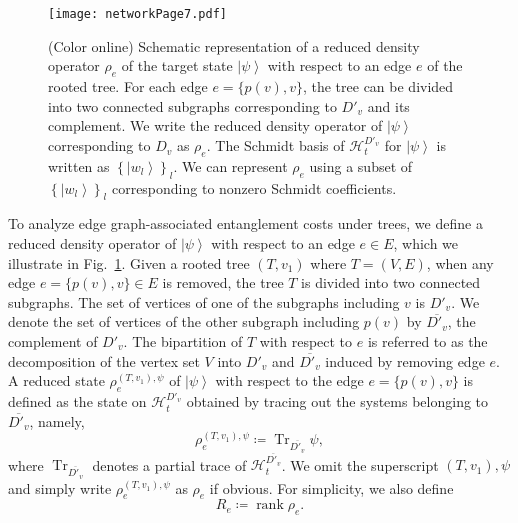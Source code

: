 \documentclass[preprintnumbers,aps,amsmath,amssymb,pra,twocolumn,showpacs,superscriptaddress,floatfix]{revtex4-1}
\def\Ket#1{\left|#1\right\rangle}
\DeclareMathOperator{\rank}{rank}
\DeclareMathOperator{\tr}{Tr}
\theoremstyle{plain}
\theoremstyle{definition}
\theoremstyle{remark}
\begin{document}
\begin{figure}
\centering
\texttt{[image: networkPage7.pdf]}
\caption{(Color online) Schematic representation of a reduced density operator $\rho_e$ of the target state $\Ket\psi$ with respect to an edge $e$ of the rooted tree.
    For each edge $e=\{p(v),v\}$, the tree can be divided into two connected subgraphs corresponding to $D'_v$ and its complement.  We write the reduced density operator of $\Ket\psi$ corresponding to $D_v$ as $\rho_e$.  The Schmidt basis of $\mathcal{H}^{D'_v}_t$ for $\Ket\psi$ is written as $\left\{\Ket{w_l}\right\} _{l}$.  We can represent $\rho_e$ using a subset of $\left\{\Ket{w_l}\right\} _{l}$ corresponding to nonzero Schmidt coefficients.
}
\label{fig:density}
\end{figure}

To analyze edge graph-associated entanglement costs under trees, we define a reduced density operator of $\Ket{\psi}$ with respect to an edge $e\in E$, which we illustrate in Fig.~\ref{fig:density}.
Given a rooted tree $(T,v_1)$ where $T=(V,E)$, when any edge $e=\{p(v),v\}\in E$ is removed, the tree $T$ is divided into two connected subgraphs.   The set of vertices of one of the subgraphs including $v$ is $D'_v$.  We denote the set of vertices of the other subgraph including $p(v)$ by $\overline{D'_v}$, the complement of $D'_v$.    The bipartition of $T$ with respect to $e$ is referred to as the decomposition of the vertex set $V$ into $D'_v$ and $\overline{D'_v}$ induced by removing edge $e$.  A reduced state $\rho_e^{(T,v_1),\psi}$ of $\Ket{\psi}$ with respect to the edge $e=\{p(v),v\}$ is defined as the state on $\mathcal{H}_t^{D'_v}$ obtained by tracing out the systems belonging to $\overline{D'_v}$, namely,
\[
    \rho_e^{(T,v_1),\psi}\coloneqq \tr_{\overline{D'_v}}\psi,
\]
where $\tr_{\overline{D'_v}}$ denotes a partial trace of $\mathcal{H}_t^{\overline{D'_v}}$.
We omit the superscript $(T,v_1),\psi$ and simply write $\rho_e^{(T,v_1),\psi}$ as $\rho_e$ if obvious.   For simplicity, we also define  
\[
    R_e \coloneqq \rank \rho_{e}.
\]
\end{document}
